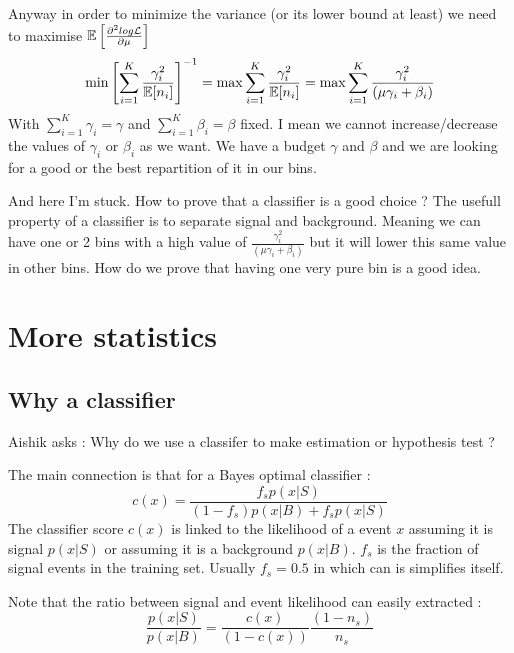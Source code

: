 Anyway in order to minimize the variance (or its lower bound at least) we need to maximise $\mathbb{E} \left [ \frac{\partial^2 log \mathcal L}{\partial \mu}  \right ]$ \ie 
\begin{equation}
    \min \left [ \sum_{i=1}^K  \frac{\gamma_i^2}{\mathbb{E}[n_i]} \right ] ^{-1} = \max \sum_{i=1}^K  \frac{\gamma_i^2}{\mathbb{E}[n_i]} = \max \sum_{i=1}^K  \frac{\gamma_i^2}{(\mu \gamma_i + \beta_i)}
\end{equation}
With $\sum_{i=1}^K \gamma_i = \gamma$ and $\sum_{i=1}^K \beta_i = \beta$ fixed. I mean we cannot increase/decrease the values of $\gamma_i$ or $\beta_i$ as we want. We have a budget $\gamma$ and $\beta$ and we are looking for a good or the best repartition of it in our bins.

And here I'm stuck.
How to prove that a classifier is a good choice ?
The usefull property of a classifier is to separate signal and background.
Meaning we can have one or 2 bins with a high value of $\frac{\gamma_i^2}{(\mu \gamma_i + \beta_i)}$ but it will lower this same value in other bins. How do we prove that having one very pure bin is a good idea.





\section{More statistics} %
\label{sec:more_statistics}



\subsection{Why a classifier} %
\label{sub:why_a_classifier}

Aishik asks : Why do we use a classifer to make estimation or hypothesis test ?

The main connection is that for a Bayes optimal classifier \needcite : 
\begin{equation}
	c(x) = \frac{f_s p(x|S)}{(1-f_s) p(x|B) + f_s p(x|S)}
\end{equation}
The classifier score $c(x)$ is linked to the likelihood of a event $x$ assuming it is signal $ p(x|S)$ or assuming it is a background $p(x|B)$.
$f_s$ is the fraction of signal events in the training set.
Usually $f_s = 0.5$ in which can is simplifies itself.

Note that the ratio between signal and event likelihood can easily extracted :
\begin{equation}
	\frac{p(x|S)}{p(x|B)} = \frac{c(x)}{(1-c(x))} \frac{(1-n_s)}{n_s} 
\end{equation}


